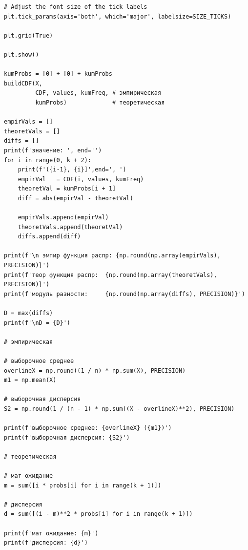 \documentclass[a4paper, 14pt]{extarticle}
\begin{document}
\begin{lstlisting}
# Adjust the font size of the tick labels
plt.tick_params(axis='both', which='major', labelsize=SIZE_TICKS)

plt.grid(True)

plt.show()

kumProbs = [0] + [0] + kumProbs
buildCDF(X, 
         CDF, values, kumFreq, # эмпирическая
         kumProbs)             # теоретическая

empirVals = []
theoretVals = []
diffs = []
print(f'значение: ', end='')
for i in range(0, k + 2):
    print(f'({i-1}, {i}]',end=', ')
    empirVal   = CDF(i, values, kumFreq)
    theoretVal = kumProbs[i + 1]
    diff = abs(empirVal - theoretVal)

    empirVals.append(empirVal)
    theoretVals.append(theoretVal)
    diffs.append(diff)

print(f'\n эмпир функция распр: {np.round(np.array(empirVals), PRECISION)}')
print(f'теор функция распр:  {np.round(np.array(theoretVals), PRECISION)}')
print(f'модуль разности:     {np.round(np.array(diffs), PRECISION)}')

D = max(diffs)
print(f'\nD = {D}')

# эмпирическая

# выборочное среднее
overlineX = np.round((1 / n) * np.sum(X), PRECISION)
m1 = np.mean(X)

# выборочная дисперсия
S2 = np.round(1 / (n - 1) * np.sum((X - overlineX)**2), PRECISION)

print(f'выборочное среднее: {overlineX} ({m1})')
print(f'выборочная дисперсия: {S2}')

# теоретическая

# мат ожидание
m = sum([i * probs[i] for i in range(k + 1)])

# дисперсия
d = sum([(i - m)**2 * probs[i] for i in range(k + 1)])

print(f'мат ожидание: {m}')
print(f'дисперсия: {d}')
\end{lstlisting}
\end{document}
